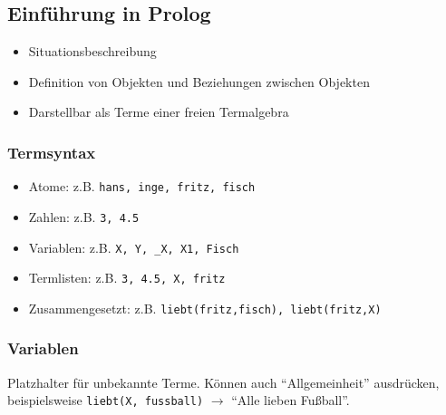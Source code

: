 \subsection{Einführung in Prolog}
\begin{itemize}
	\item Situationsbeschreibung
	\item Definition von Objekten und Beziehungen zwischen Objekten
	\item Darstellbar als Terme einer freien Termalgebra
\end{itemize}

\subsubsection{Termsyntax}
\begin{itemize}
	\item Atome: z.B. \texttt{hans, inge, fritz, fisch}
	\item Zahlen: z.B. \texttt{3, 4.5}
	\item Variablen: z.B. \texttt{X, Y, \_X, X1, Fisch}
	\item Termlisten: z.B. \texttt{3, 4.5, X, fritz}
	\item Zusammengesetzt: z.B. \texttt{liebt(fritz,fisch), liebt(fritz,X)}
\end{itemize}

\subsubsection{Variablen}
Platzhalter für unbekannte Terme. Können auch "`Allgemeinheit"' ausdrücken, beispielsweise \texttt{liebt(X, fussball)} \(\rightarrow\) "`Alle lieben Fußball"'.

